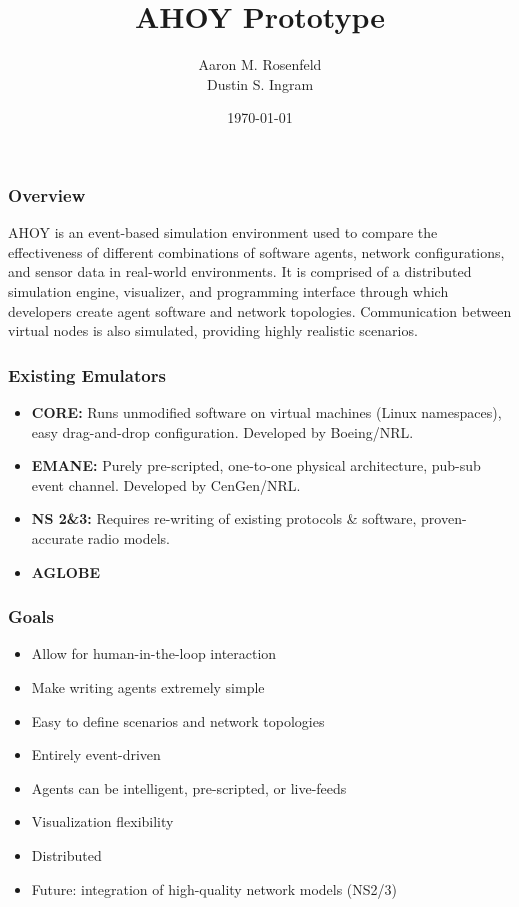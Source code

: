 \documentclass[mathserif]{beamer}
\title{AHOY Prototype}
\author{Aaron M. Rosenfeld \\ Dustin S. Ingram}
\date{\today}
\begin{document}
\frame{\titlepage}

\frame
{
    \frametitle{Overview}
    AHOY is an event-based simulation environment used to compare the
    effectiveness of different combinations of software agents, network
    configurations, and sensor data in real-world environments.  It is comprised of
    a distributed simulation engine, visualizer, and programming interface through
    which developers create agent software and network topologies.  Communication
    between virtual nodes is also simulated, providing highly realistic scenarios.
}

\frame
{
    \frametitle{Existing Emulators}

    \begin{itemize}
        \item \textbf{CORE:} Runs unmodified software on virtual machines (Linux namespaces), easy drag-and-drop configuration.  Developed by Boeing/NRL.
        \item \textbf{EMANE:} Purely pre-scripted, one-to-one physical architecture, pub-sub event channel.  Developed by CenGen/NRL.
        \item \textbf{NS 2\&3:} Requires re-writing of existing protocols \& software, proven-accurate radio models.
        \item \textbf{AGLOBE} 
    \end{itemize}
}

\frame
{
    \frametitle{Goals}
    \begin{itemize}
        \item Allow for human-in-the-loop interaction
        \item Make writing agents extremely simple
        \item Easy to define scenarios and network topologies
        \item Entirely event-driven
        \item Agents can be intelligent, pre-scripted, or live-feeds
        \item Visualization flexibility
        \item Distributed
        \item Future: integration of high-quality network models (NS2/3)
    \end{itemize}
}
\end{document}
